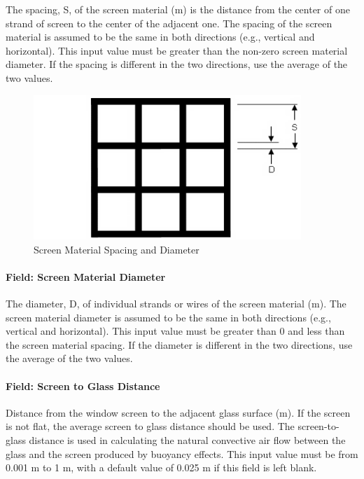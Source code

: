 The spacing, S, of the screen material (m) is the distance from the center of one strand of screen to the center of the adjacent one. The spacing of the screen material is assumed to be the same in both directions (e.g., vertical and horizontal). This input value must be greater than the non-zero screen material diameter. If the spacing is different in the two directions, use the average of the two values.

\begin{figure}[hbtp] %
\centering
\includegraphics[width=0.9\textwidth, height=0.9\textheight, keepaspectratio=true]{media/image044.png}
\caption{Screen Material Spacing and Diameter \protect \label{fig:screen-material-spacing-and-diameter}}
\end{figure}

\paragraph{Field: Screen Material Diameter}\label{field-screen-material-diameter}

The diameter, D, of individual strands or wires of the screen material (m). The screen material diameter is assumed to be the same in both directions (e.g., vertical and horizontal). This input value must be greater than 0 and less than the screen material spacing. If the diameter is different in the two directions, use the average of the two values.

\paragraph{Field: Screen to Glass Distance}\label{field-screen-to-glass-distance}

Distance from the window screen to the adjacent glass surface (m). If the screen is not flat, the average screen to glass distance should be used. The screen-to-glass distance is used in calculating the natural convective air flow between the glass and the screen produced by buoyancy effects. This input value must be from 0.001 m to 1 m, with a default value of 0.025 m if this field is left blank.

